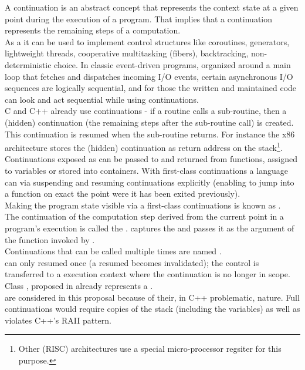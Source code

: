 
A continuation is an abstract concept that represents the context state at a
given point during the execution of a program. That implies that a continuation
represents the remaining steps of a computation.\\

As a  it can be used to implement control
structures like coroutines,  generators, lightweight threads, cooperative
multitasking (fibers), backtracking, non-deterministic choice. In classic
event-driven programs, organized around a main loop that fetches and dispatches
incoming I/O events, certain asynchronous I/O sequences are logically
sequential, and for those the written and maintained code can look and act
sequential while using continuations.\\

C and C++ already use continuations - if a routine calls a sub-routine, then a
(hidden) continuation (the remaining steps after the sub-routine call) is
created. This continuation is resumed when the sub-routine returns. For
instance the x86 architecture stores the (hidden) continuation as return address
on the stack\footnote{Other (RISC) architectures use a special micro-processor
regsiter for this purpose.}.\\

Continuations exposed as  can be passed to and
returned from functions, assigned to variables or stored into containers. With
first-class continuations a language can 
via suspending and resuming continuations explicitly (enabling to jump into a
function on exact the point were it has been exited previously).\\
Making the program state visible via a first-class continuations is known as
.\\

The continuation of the computation step derived from the current point in a
program's execution is called the . \cc captures the
 and passes it as the argument of the function invoked by
\cc.\\

Continuations that can be called multiple times are named
.\\
 can only resumed once (a resumed 
 becomes invalidated); the control is transferred to
a execution context where the continuation is no longer in scope.\\
Class , proposed in \cite{P0099R1}
already represents a .\\
 are  considered in this proposal because of
their, in C++ problematic, nature.  Full continuations would require copies of
the stack (including the variables) as well as violates C++'s RAII pattern.\\

